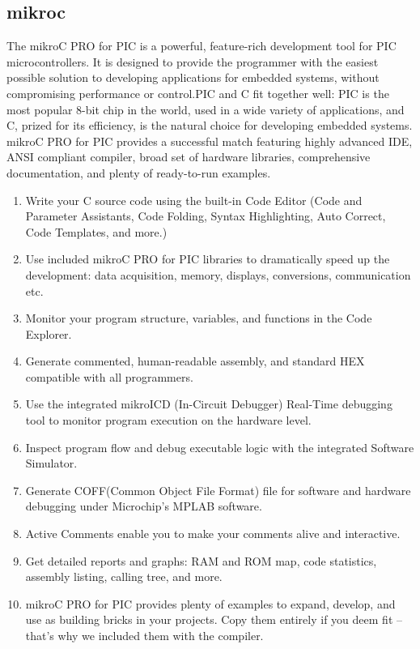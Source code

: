 \documentclass[12pt,a4paper]{report}
\begin{document}
\subsection{mikroc}
 \hspace*{1cm}
The mikroC PRO for PIC is a powerful, feature-rich development tool for PIC microcontrollers. It is designed to provide the programmer with the easiest possible solution to developing applications for embedded systems, without compromising performance or control.PIC and C fit together well: PIC is the most popular 8-bit chip in the world, used in a wide variety of applications, and C, prized for its efficiency, is the natural choice for developing embedded systems. mikroC PRO for PIC provides a successful match featuring highly advanced IDE, ANSI compliant compiler, broad set of hardware libraries, comprehensive documentation, and plenty of ready-to-run examples.
\begin{enumerate}
\item Write your C source code using the built-in Code Editor (Code and Parameter Assistants, Code Folding, Syntax Highlighting, Auto Correct, Code Templates, and more.)
\item Use included mikroC PRO for PIC libraries to dramatically speed up the development: data acquisition, memory, displays, conversions, communication etc.
\item Monitor your program structure, variables, and functions in the Code Explorer.
\item Generate commented, human-readable assembly, and standard HEX compatible with all programmers.
\item Use the integrated mikroICD (In-Circuit Debugger) Real-Time debugging tool to monitor program execution on the hardware level.
\item Inspect program flow and debug executable logic with the integrated Software Simulator.
\item Generate COFF(Common Object File Format) file for software and hardware debugging under Microchip's MPLAB software.
\item Active Comments enable you to make your comments alive and interactive.
\item Get detailed reports and graphs: RAM and ROM map, code statistics, assembly listing, calling tree, and more.
\item mikroC PRO for PIC provides plenty of examples to expand, develop, and use as building bricks in your projects. Copy them entirely if you deem fit – that’s why we included them with the compiler.
\end{enumerate}
\end{document}
